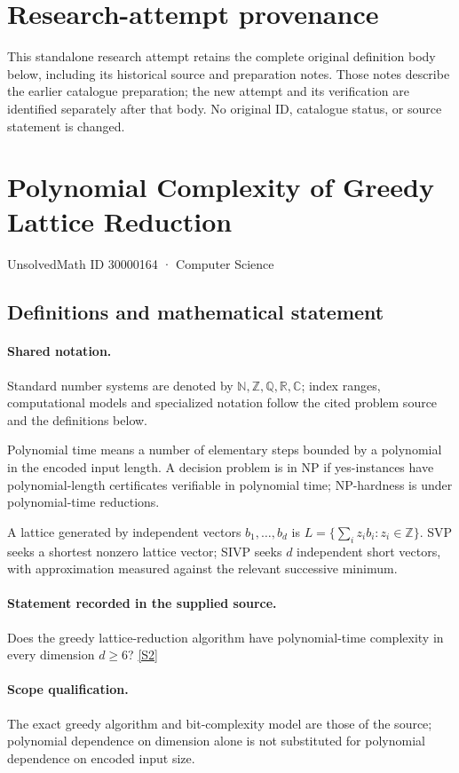 \documentclass[11pt]{article}
\begin{document}
\section*{Research-attempt provenance}
This standalone research attempt retains the complete original definition body below,
including its historical source and preparation notes. Those notes describe the
earlier catalogue preparation; the new attempt and its verification are identified
separately after that body. No original ID, catalogue status, or source statement is changed.

\section{Polynomial Complexity of Greedy Lattice Reduction}\label{30000164}
{\small UnsolvedMath ID 30000164 · Computer Science}
\subsection{Definitions and mathematical statement}

\paragraph{Shared notation.}Standard number systems are denoted by $\mathbb N,\mathbb Z,\mathbb Q,\mathbb R,\mathbb C$; index ranges, computational models and specialized notation follow the cited problem source and the definitions below.


Polynomial time means a number of elementary steps bounded by a polynomial in the encoded input length. A decision problem is in $\mathrm{NP}$ if yes-instances have polynomial-length certificates verifiable in polynomial time; NP-hardness is under polynomial-time reductions.

A lattice generated by independent vectors $b_1,\ldots,b_d$ is $L=\{\sum_i z_i b_i:z_i\in\mathbb Z\}$. SVP seeks a shortest nonzero lattice vector; SIVP seeks $d$ independent short vectors, with approximation measured against the relevant successive minimum.
\paragraph{Statement recorded in the supplied source.}
Does the greedy lattice-reduction algorithm have polynomial-time complexity in every dimension $d\geq6$? \href{https://doi.org/10.4171/owr/2005/01}{[S2]}
\paragraph{Scope qualification.}
The exact greedy algorithm and bit-complexity model are those of the source; polynomial dependence on dimension alone is not substituted for polynomial dependence on encoded input size.
\end{document}
